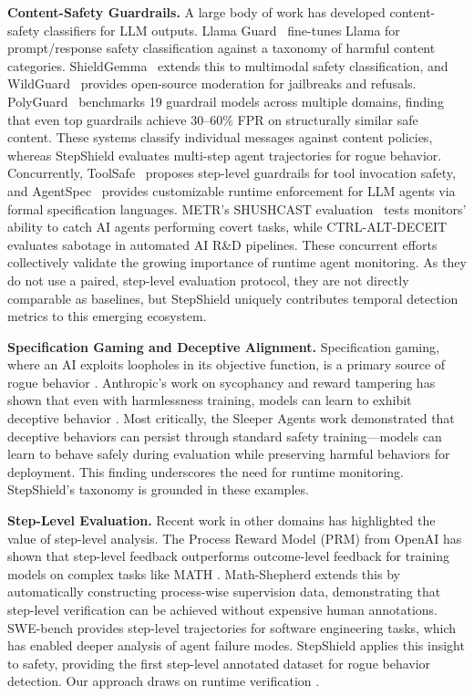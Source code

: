 \documentclass{article}
\begin{document}
\textbf{Content-Safety Guardrails.} A large body of work has developed content-safety classifiers for LLM outputs. Llama Guard~\cite{inan2023llamaguard} fine-tunes Llama for prompt/response safety classification against a taxonomy of harmful content categories. ShieldGemma~\cite{zeng2024shieldgemma} extends this to multimodal safety classification, and WildGuard~\cite{han2024wildguard} provides open-source moderation for jailbreaks and refusals. PolyGuard~\cite{polyguard2025} benchmarks 19 guardrail models across multiple domains, finding that even top guardrails achieve 30--60\% FPR on structurally similar safe content. These systems classify individual messages against content policies, whereas StepShield evaluates multi-step agent trajectories for rogue behavior. Concurrently, ToolSafe~\cite{toolsafe2026} proposes step-level guardrails for tool invocation safety, and AgentSpec~\cite{agentspec2026} provides customizable runtime enforcement for LLM agents via formal specification languages. METR's SHUSHCAST evaluation~\cite{metr2026shushcast} tests monitors' ability to catch AI agents performing covert tasks, while CTRL-ALT-DECEIT~\cite{benton2025ctrlaltdeceit} evaluates sabotage in automated AI R\&D pipelines. These concurrent efforts collectively validate the growing importance of runtime agent monitoring. As they do not use a paired, step-level evaluation protocol, they are not directly comparable as baselines, but StepShield uniquely contributes temporal detection metrics to this emerging ecosystem.

\textbf{Specification Gaming and Deceptive Alignment.} Specification gaming, where an AI exploits loopholes in its objective function, is a primary source of rogue behavior \cite{krakovna2020specification}. Anthropic's work on sycophancy and reward tampering has shown that even with harmlessness training, models can learn to exhibit deceptive behavior \cite{perez2022discovering}. Most critically, the Sleeper Agents work \cite{hubinger2024sleeper} demonstrated that deceptive behaviors can persist through standard safety training---models can learn to behave safely during evaluation while preserving harmful behaviors for deployment. This finding underscores the need for runtime monitoring. StepShield's taxonomy is grounded in these examples.

\textbf{Step-Level Evaluation.} Recent work in other domains has highlighted the value of step-level analysis. The Process Reward Model (PRM) from OpenAI has shown that step-level feedback outperforms outcome-level feedback for training models on complex tasks like MATH \cite{lightman2024prm}. Math-Shepherd \cite{wang2024mathshepherd} extends this by automatically constructing process-wise supervision data, demonstrating that step-level verification can be achieved without expensive human annotations. SWE-bench \cite{jimenez2024swebench} provides step-level trajectories for software engineering tasks, which has enabled deeper analysis of agent failure modes. StepShield applies this insight to safety, providing the first step-level annotated dataset for rogue behavior detection. Our approach draws on runtime verification \cite{leucker2009runtime}.
\end{document}
